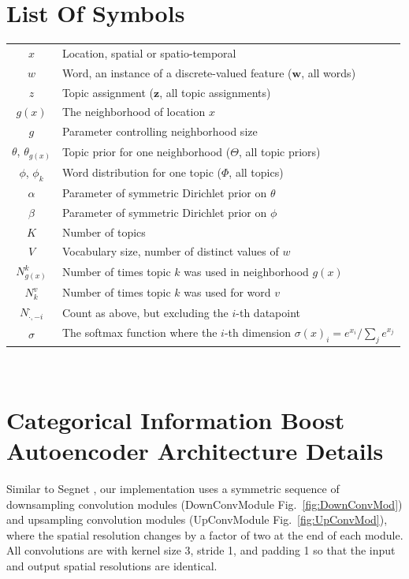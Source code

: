 
\begin{appendices}
\chapter{List Of Symbols}
\begin{tabular}{cp{\textwidth}}
  $x$ & Location, spatial or spatio-temporal \\
  $w$ & Word, an instance of a discrete-valued feature ($\textbf{w}$, all words) \\
  $z$ & Topic assignment ($\textbf{z}$, all topic assignments) \\
  $g(x)$ & The neighborhood of location $x$ \\
  $g$ & Parameter controlling neighborhood size \\
  $\theta$, $\theta_{g(x)}$ & Topic prior for one neighborhood ($\Theta$, all topic priors)\\
  $\phi$, $\phi_k$ & Word distribution for one topic ($\Phi$, all topics) \\
  $\alpha$ & Parameter of symmetric Dirichlet prior on $\theta$ \\
  $\beta$ & Parameter of symmetric Dirichlet prior on $\phi$ \\
  $K$ & Number of topics \\
  $V$ & Vocabulary size, number of distinct values of $w$ \\
  $N_{g(x)}^k$ & Number of times topic $k$ was used in neighborhood $g(x)$ \\
  $N_k^v$ & Number of times topic $k$ was used for word $v$ \\
  $N_{\cdot,-i}^\cdot$ & Count as above, but excluding the $i$-th datapoint\\
  $\sigma$ & The softmax function where the $i$-th dimension $\sigma(x)_i = {e^{x_i}} / \sum_j e^{x_j}$
\end{tabular}\\

\chapter{Categorical Information Boost Autoencoder Architecture Details} \label{ch:cibae-arch}
Similar to Segnet \citep{BadrinarayananK15}, our implementation uses a symmetric sequence of downsampling convolution modules (DownConvModule Fig.~\ref{fig:DownConvMod}) and upsampling convolution modules (UpConvModule Fig.~\ref{fig:UpConvMod}), where the spatial resolution changes by a factor of two at the end of each module. All convolutions are with kernel size 3, stride 1, and padding 1 so that the input and output spatial resolutions are identical.


\end{appendices}
